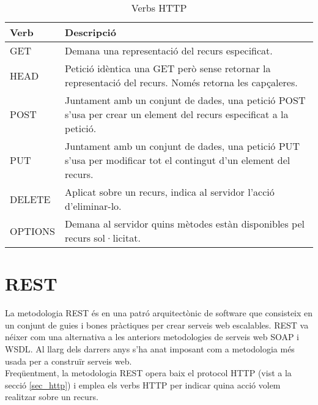 \begin{table}[here]
 	\begin{center}
 		\begin{tabularx}{\textwidth}{|l|X|}
  			\hline
 			\bfseries Verb & \bfseries Descripció \\ \hline
			GET &  Demana una representació del recurs especificat. \\ \hline
			HEAD & Petició idèntica una GET però sense retornar la representació del recurs. Només retorna les capçaleres.\\ \hline
			POST & Juntament amb un conjunt de dades, una petició POST s'usa per crear un element del recurs especificat a la petició.\\ \hline
			PUT & Juntament amb un conjunt de dades, una petició PUT s'usa per modificar tot el contingut d'un element del recurs.\\ \hline
			DELETE & Aplicat sobre un recurs, indica al servidor l'acció d'eliminar-lo.\\ \hline
			OPTIONS & Demana al servidor quins mètodes estàn disponibles pel recurs sol·licitat.\\ \hline
		\end{tabularx}
	\end{center}
	\label{table:verbs_http}
	\caption{Verbs \ac{HTTP}} 
\end{table}
\section{\ac{REST}}
La metodologia \ac{REST} és en una patró arquitectònic de software que consisteix en un conjunt de guies i bones pràctiques per crear serveis web escalables. \ac{REST} va néixer com una alternativa a les anteriors metodologies de serveis web \ac{SOAP} i \ac{WSDL}. Al llarg dels darrers anys s'ha anat imposant com a metodologia més usada per a construïr serveis web.\\

Freqüentment, la metodologia \ac{REST} opera baix el protocol \ac{HTTP} (vist a la secció \ref{sec_http}) i emplea els verbs \ac{HTTP} per indicar quina acció volem realitzar sobre un recurs.\\

